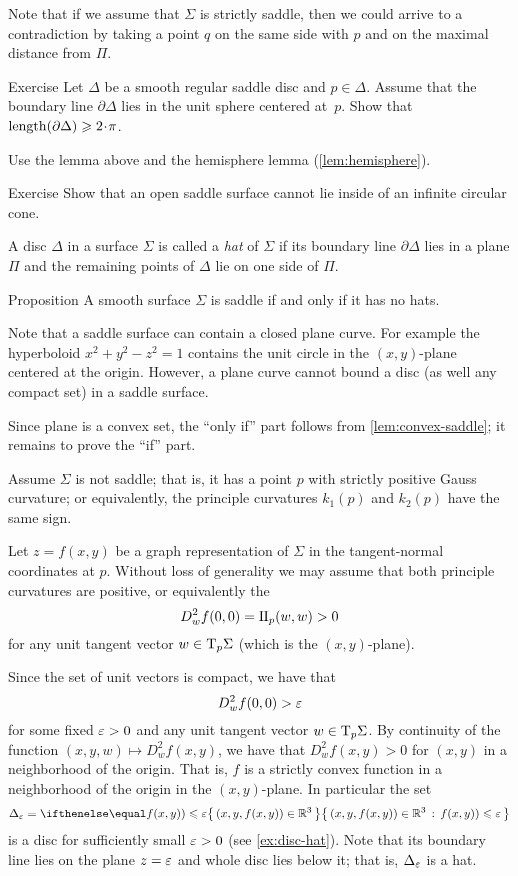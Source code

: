 Note that if we assume that $\Sigma$ is strictly saddle, then we could arrive to a contradiction by taking a point $q$ on the same side with $p$ and on the maximal distance from $\Pi$.

\begin{thm}{Exercise}\label{ex:length-of-bry}
Let $\Delta$ be a smooth regular saddle disc and $p\in \Delta$.
Assume that the boundary line $\partial \Delta$ lies in the unit sphere centered at~$p$.
Show that $\length (\partial \Delta)\ge 2\cdot\pi$.
\end{thm}

 Use the lemma above and the hemisphere lemma (\ref{lem:hemisphere}).

\begin{thm}{Exercise}\label{ex:circular-cone-saddle}
Show that an open saddle surface
cannot lie inside of an infinite circular cone. 
\end{thm}

A disc $\Delta$ in a surface $\Sigma$ is called a \emph{hat} of $\Sigma$
if its boundary line $\partial\Delta$ lies in a plane $\Pi$ and the remaining points of $\Delta$ lie on one side of $\Pi$.

\begin{thm}{Proposition}\label{prop:hat}
A smooth surface $\Sigma$ is saddle if and only if it has no hats.
\end{thm}

Note that a saddle surface can contain a closed plane curve.
For example the hyperboloid $x^2+y^2-z^2=1$ contains the unit circle in the $(x,y)$-plane centered at the origin.
However, a plane curve cannot bound a disc (as well any compact set) in a saddle surface.

Since plane is a convex set, the ``only if'' part follows from \ref{lem:convex-saddle};
it remains to prove the ``if'' part.

Assume $\Sigma$ is not saddle; that is, it has a point $p$ with strictly positive Gauss curvature;
or equivalently, the principle curvatures $k_1(p)$ and $k_2(p)$ have the same sign.

Let $z=f(x,y)$ be a graph representation of $\Sigma$ in the tangent-normal coordinates at $p$.
Without loss of generality we may assume that both principle curvatures are positive,
or equivalently the 
\[D^2_wf(0,0)=\mathrm{I}\hskip-.02em\mathrm{I}_p(w,w)>0\] 
for any unit tangent vector $w\in\mathrm{T}_p\Sigma$ (which is the $(x,y)$-plane).

Since the set of unit vectors is compact, we have that 
\[D^2_wf(0,0)>\varepsilon\]
for some fixed $\varepsilon>0$ and any unit tangent vector $w\in\mathrm{T}_p\Sigma$.
By continuity of the function $(x,y,w)\mapsto D^2_wf(x,y)$,
we have that $D^2_wf(x,y)>0$ for $(x,y)$ in a neighborhood of the origin.
That is, $f$ is a strictly convex function in a neighborhood of the origin in the $(x,y)$-plane.
In particular the set 
\[\Delta_\eps=\set{(x,y,f(x,y))\in \RR^3}{f(x,y))\le \eps}\]
is a disc for sufficiently small $\varepsilon>0$ (see \ref{ex:disc-hat}).
Note that its boundary line lies on the plane $z=\varepsilon$ and whole disc lies below it;
that is, $\Delta_\varepsilon$ is a hat.
\qeds

